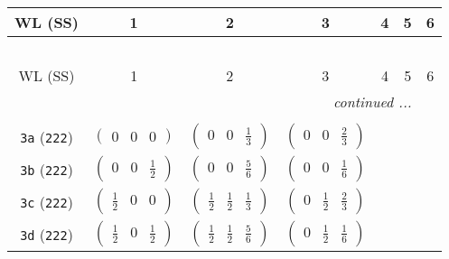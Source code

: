 \documentclass[fleqn,9pt,landscape]{jsarticle}
\begin{document}
\begin{center}
\renewcommand{\arraystretch}{1.2}
\begin{longtable}{ccccccc}
 \hline \hline
WL (SS) & 1 & 2 & 3 & 4 & 5 & 6 \\ \hline \endfirsthead

\multicolumn{6}{l}{\tablename\ \thetable{}} \\
 \hline \hline
WL (SS) & 1 & 2 & 3 & 4 & 5 & 6 \\ \hline \endhead

 \hline \hline
\multicolumn{6}{r}{\footnotesize\it continued ...} \\ \endfoot

 \hline \hline
\multicolumn{6}{r}{} \\ \endlastfoot

{\tt 3a} ({\tt 222}) & $ \begin{pmatrix} 0 & 0 & 0 \end{pmatrix} $ & $ \begin{pmatrix} 0 & 0 & \frac{1}{3} \end{pmatrix} $ & $ \begin{pmatrix} 0 & 0 & \frac{2}{3} \end{pmatrix} $ & $  $ & $  $ & $  $ \\ \hline
{\tt 3b} ({\tt 222}) & $ \begin{pmatrix} 0 & 0 & \frac{1}{2} \end{pmatrix} $ & $ \begin{pmatrix} 0 & 0 & \frac{5}{6} \end{pmatrix} $ & $ \begin{pmatrix} 0 & 0 & \frac{1}{6} \end{pmatrix} $ & $  $ & $  $ & $  $ \\ \hline
{\tt 3c} ({\tt 222}) & $ \begin{pmatrix} \frac{1}{2} & 0 & 0 \end{pmatrix} $ & $ \begin{pmatrix} \frac{1}{2} & \frac{1}{2} & \frac{1}{3} \end{pmatrix} $ & $ \begin{pmatrix} 0 & \frac{1}{2} & \frac{2}{3} \end{pmatrix} $ & $  $ & $  $ & $  $ \\ \hline
{\tt 3d} ({\tt 222}) & $ \begin{pmatrix} \frac{1}{2} & 0 & \frac{1}{2} \end{pmatrix} $ & $ \begin{pmatrix} \frac{1}{2} & \frac{1}{2} & \frac{5}{6} \end{pmatrix} $ & $ \begin{pmatrix} 0 & \frac{1}{2} & \frac{1}{6} \end{pmatrix} $ & $  $ & $  $ & $  $ \\ \hline

\end{longtable}
\end{center}
\end{document}

